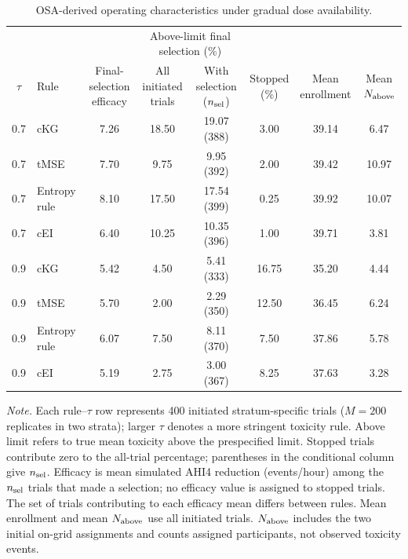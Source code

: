 \documentclass[11pt]{article}
\newcommand{\rev}[1]{{#1}}
\newcommand{\revisioncolor}{}
\begin{document}
\begin{table}[H]
\revisioncolor
\centering
\footnotesize
\setlength{\tabcolsep}{4pt}
\caption{OSA-derived operating characteristics under gradual dose availability.}
\label{tab:gradual}
\begin{tabular}{@{}clcccccc@{}}
\toprule
& & & \multicolumn{2}{c}{Above-limit final selection (\%)} & & & \\
\cmidrule(lr){4-5}
$\tau$ & Rule & \shortstack{Final-selection\\efficacy} & \shortstack{All initiated\\trials} & \shortstack{With selection\\($n_{\rm sel}$)} & \shortstack{Stopped\\(\%)} & \shortstack{Mean\\enrollment} & \shortstack{Mean\\$N_{\rm above}$} \\
\midrule
0.7 & cKG & 7.26 & 18.50 & 19.07 (388) & 3.00 & 39.14 & 6.47 \\
0.7 & tMSE & 7.70 & 9.75 & 9.95 (392) & 2.00 & 39.42 & 10.97 \\
0.7 & Entropy rule & 8.10 & 17.50 & 17.54 (399) & 0.25 & 39.92 & 10.07 \\
0.7 & cEI & 6.40 & 10.25 & 10.35 (396) & 1.00 & 39.71 & 3.81 \\
0.9 & cKG & 5.42 & 4.50 & 5.41 (333) & 16.75 & 35.20 & 4.44 \\
0.9 & tMSE & 5.70 & 2.00 & 2.29 (350) & 12.50 & 36.45 & 6.24 \\
0.9 & Entropy rule & 6.07 & 7.50 & 8.11 (370) & 7.50 & 37.86 & 5.78 \\
0.9 & cEI & 5.19 & 2.75 & 3.00 (367) & 8.25 & 37.63 & 3.28 \\
\bottomrule
\end{tabular}
\vspace{3pt}
\begin{minipage}{0.98\linewidth}
\scriptsize\raggedright
\textit{Note.} Each rule--$\tau$ row represents 400 initiated stratum-specific trials ($M=200$ replicates in two strata); larger $\tau$ denotes a more stringent toxicity rule. Above limit refers to true mean toxicity above the prespecified limit. Stopped trials contribute zero to the all-trial percentage; parentheses in the conditional column give $n_{\rm sel}$. \rev{Efficacy is mean simulated AHI4 reduction (events/hour) among the $n_{\rm sel}$ trials that made a selection}; no efficacy value is assigned to stopped trials. \rev{The set of trials contributing to each efficacy mean differs between rules.} Mean enrollment and mean $N_{\rm above}$ use all initiated trials. $N_{\rm above}$ includes the two initial on-grid assignments and counts assigned participants, not observed toxicity events.
\end{minipage}
\end{table}
\end{document}
